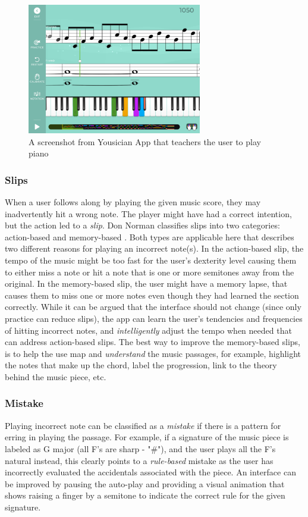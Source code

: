 \documentclass[12pt,letterpaper]{article}
\begin{document}
\begin{figure}[h]
\centering
\includegraphics[width=3in,scale=.6]{figures/p3/yousician.png}
\caption{A screenshot from Yousician App that teachers the user to play piano}
\label{fig::2}
\end{figure}

\subsubsection*{Slips}
When a user follows along by playing the given music score, they may inadvertently hit a wrong note. The player might have had a correct intention, but the action led to a \textit{slip}. Don Norman classifies slips into two categories: action-based and memory-based \cite{norman2013design}. Both types are applicable here that describes two different reasons for playing an incorrect note(s). In the action-based slip, the tempo of the music might be too fast for the user's dexterity level causing them to either miss a note or hit a note that is one or more semitones away from the original. In the memory-based slip, the user might have a memory lapse, that causes them to miss one or more notes even though they had learned the section correctly. While it can be argued that the interface should not change (since only practice can reduce slips), the app can learn the user's tendencies and frequencies of hitting incorrect notes, and \textit{intelligently} adjust the tempo when needed that can address action-based slips. The best way to improve the memory-based slips, is to help the use map and \textit{understand} the music passages, for example, highlight the notes that make up the chord, label the progression, link to the theory behind the music piece, etc.         

\subsubsection*{Mistake}
Playing incorrect note can be classified as a \textit{mistake} if there is a pattern for erring in playing the passage. For example, if a signature of the music piece is labeled as G major (all F's are sharp - "\#"), and the user plays all the F's natural instead, this clearly points to a \textit{rule-based} mistake as the user has incorrectly evaluated the accidentals associated with the piece. An interface can be improved by pausing the auto-play and providing a visual animation that shows raising a finger by a semitone to indicate the correct rule for the given signature.
\end{document}
